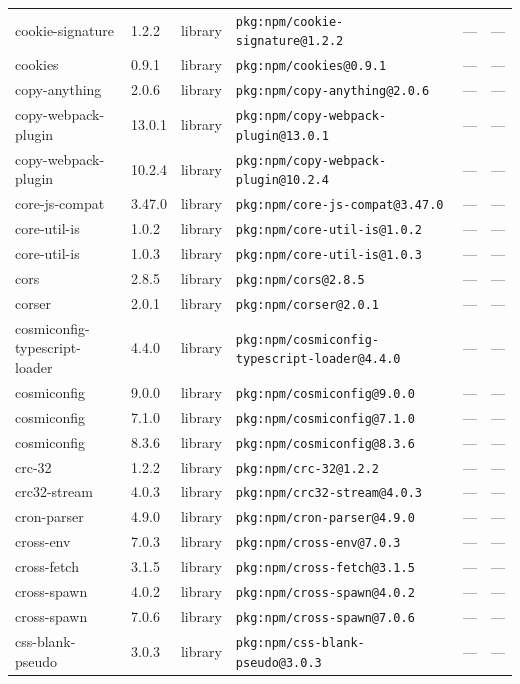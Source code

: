 \documentclass[11pt]{article}
\begin{document}
\begin{longtable}{|l|l|l|p{2.2cm}|l|p{4cm}|}
cookie-signature & 1.2.2 & library & \texttt{pkg:npm/cookie-signature@1.2.2} & — & — \\
cookies & 0.9.1 & library & \texttt{pkg:npm/cookies@0.9.1} & — & — \\
copy-anything & 2.0.6 & library & \texttt{pkg:npm/copy-anything@2.0.6} & — & — \\
copy-webpack-plugin & 13.0.1 & library & \texttt{pkg:npm/copy-webpack-plugin@13.0.1} & — & — \\
copy-webpack-plugin & 10.2.4 & library & \texttt{pkg:npm/copy-webpack-plugin@10.2.4} & — & — \\
core-js-compat & 3.47.0 & library & \texttt{pkg:npm/core-js-compat@3.47.0} & — & — \\
core-util-is & 1.0.2 & library & \texttt{pkg:npm/core-util-is@1.0.2} & — & — \\
core-util-is & 1.0.3 & library & \texttt{pkg:npm/core-util-is@1.0.3} & — & — \\
cors & 2.8.5 & library & \texttt{pkg:npm/cors@2.8.5} & — & — \\
corser & 2.0.1 & library & \texttt{pkg:npm/corser@2.0.1} & — & — \\
cosmiconfig-typescript-loader & 4.4.0 & library & \texttt{pkg:npm/cosmiconfig-typescript-loader@4.4.0} & — & — \\
cosmiconfig & 9.0.0 & library & \texttt{pkg:npm/cosmiconfig@9.0.0} & — & — \\
cosmiconfig & 7.1.0 & library & \texttt{pkg:npm/cosmiconfig@7.1.0} & — & — \\
cosmiconfig & 8.3.6 & library & \texttt{pkg:npm/cosmiconfig@8.3.6} & — & — \\
crc-32 & 1.2.2 & library & \texttt{pkg:npm/crc-32@1.2.2} & — & — \\
crc32-stream & 4.0.3 & library & \texttt{pkg:npm/crc32-stream@4.0.3} & — & — \\
cron-parser & 4.9.0 & library & \texttt{pkg:npm/cron-parser@4.9.0} & — & — \\
cross-env & 7.0.3 & library & \texttt{pkg:npm/cross-env@7.0.3} & — & — \\
cross-fetch & 3.1.5 & library & \texttt{pkg:npm/cross-fetch@3.1.5} & — & — \\
cross-spawn & 4.0.2 & library & \texttt{pkg:npm/cross-spawn@4.0.2} & — & — \\
cross-spawn & 7.0.6 & library & \texttt{pkg:npm/cross-spawn@7.0.6} & — & — \\
css-blank-pseudo & 3.0.3 & library & \texttt{pkg:npm/css-blank-pseudo@3.0.3} & — & — \\

\end{longtable}
\end{document}
